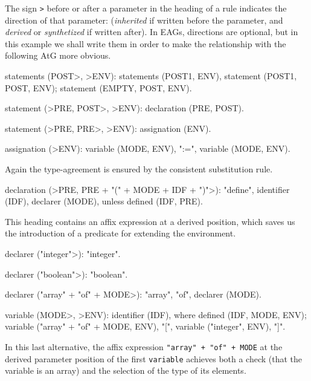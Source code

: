 The sign {\tt >} before or after a parameter in the heading of a rule
indicates the direction of that parameter:
({\em inherited} if written before the parameter, and {\em derived}
or {\em synthetized} if written after).
In EAGs, directions are optional, but in this example we shall write them
in order to make the relationship with the following AtG more obvious.
\begin{elan}
statements (POST>, >ENV):
   statements (POST1, ENV), statement (POST1, POST, ENV);
   statement (EMPTY, POST, ENV).
\end{elan}
\begin{elan}
statement (>PRE, POST>, >ENV):
   declaration (PRE, POST).
\end{elan}
\begin{elan}
statement (>PRE, PRE>, >ENV):
   assignation (ENV).
\end{elan}
\begin{elan}
assignation (>ENV):
   variable (MODE, ENV), ":=", variable (MODE, ENV).
\end{elan}
Again the type-agreement is ensured by the consistent substitution rule.
\begin{elan}
declaration (>PRE, PRE + "(" + MODE + IDF + ")">):
   "define", identifier (IDF), declarer (MODE),
       unless defined (IDF, PRE).
\end{elan}
This heading contains an affix expression at a derived position, which
saves us the introduction of a predicate for extending the environment.
\begin{elan}
declarer ("integer">): "integer".
\end{elan}
\begin{elan}
declarer ("boolean">): "boolean".
\end{elan}
\begin{elan}
declarer ("array" + "of" + MODE>):
   "array", "of", declarer (MODE).
\end{elan}
\begin{elan}
variable (MODE>, >ENV):
   identifier (IDF), where defined (IDF, MODE, ENV);
   variable ("array" + "of" + MODE, ENV),
      "[", variable ("integer", ENV), "]".
\end{elan}
In this last alternative, the affix expression {\tt "array" + "of" + MODE}
at the derived parameter position of the first {\tt variable} achieves
both a check (that the variable is an array) and the selection of
the type of its elements.

